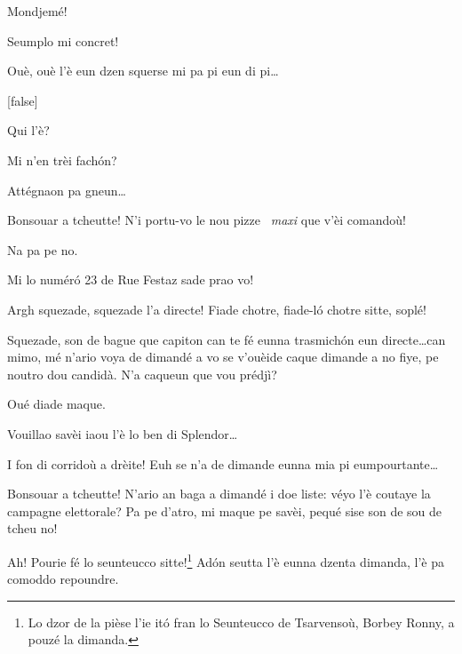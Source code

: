 \begin{drama}
\Brunospeaks {} Mondjemé!

\Jordyspeaks Seumplo mi concret!

\Brunospeaks Ouè, ouè l'è eun dzen squerse mi pa pi eun di pi\ldots

[false]

\Brunospeaks Qui l'è?

\Noteospeaks Mi n'en trèi fach\'on?

\Brunospeaks Attégnaon pa gneun\ldots


\Fattorinospeaks Bonsouar a tcheutte! N'i portu-vo le nou pizze \pizza\ \textit{maxi} que v'èi comandoù!

\Noteospeaks Na pa pe no.

\Fattorinospeaks Mi lo num\'er\'o 23 de Rue Festaz sade prao vo!

\Brunospeaks {} Argh squezade, squezade l'a directe!  Fiade chotre, fiade-l\'o chotre sitte, soplé!


\Brunospeaks {} Squezade, son de bague que capiton can te fé eunna trasmich\'on eun directe\ldots can mimo, mé n'ario voya de dimandé a vo se v'ouèide caque dimande a no fiye, pe noutro dou candidà. N'a caqueun que vou prédjì?


 \Brunospeaks {} Oué diade maque.

\SpectIspeaks Vouillao savèi iaou l'è lo ben di Splendor\ldots

\Brunospeaks I fon di corridoù a drèite! Euh se n'a de dimande eunna mia pi eumpourtante\ldots
 

\SpectIIspeaks Bonsouar a tcheutte! N'ario an baga a di\-man\-dé i doe liste: véyo l'è coutaye la campagne elettorale? Pa pe d’atro, mi maque pe savèi, pequé sise son de sou de tcheu no!

\Brunospeaks Ah! Pourie fé lo seunteucco sitte!\footnote{ Lo dzor de la pièse l'ie it\'o fran lo Seunteucco de Tsarvensoù, Borbey Ronny, a pouzé la dimanda.}  Ad\'on seutta l'è eunna dzenta dimanda, l'è pa comoddo repoundre. 


\end{drama}
